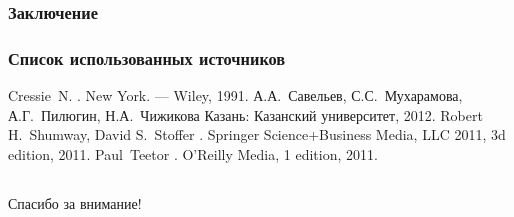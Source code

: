 \documentclass[10pt,pdf,aspectratio=169,hyperref={unicode}]{beamer}
\begin{document}
\begin{frame}
  \frametitle{Заключение}

\end{frame}

\begin{frame}
  \frametitle{Список использованных источников}
  \begin{scriptsize}
  \begin{thebibliography}{5}
    \beamertemplatebookbibitems
      Cressie~N.
      .
      \newblock New York. --- Wiley, 1991.
    \beamertemplatebookbibitems
      А.А.~Савельев, С.С.~Мухарамова, А.Г.~Пилюгин, Н.А.~Чижикова
      \newblock Казань: Казанский университет, 2012.
    \beamertemplatebookbibitems
      Robert H.~Shumway, David S.~Stoffer
      .
      \newblock Springer Science+Business Media, LLC 2011, 3d edition, 2011.
    \beamertemplatebookbibitems
      Paul~Teetor
      .
      \newblock O’Reilly Media, 1 edition, 2011.
  \end{thebibliography}
\end{scriptsize}
\end{frame}

\subsection{}
\begin{frame}
  \frametitle{}
  \begin{center}
    {\Huge Спасибо за внимание!}
  \end{center}
\end{frame}
\end{document}
